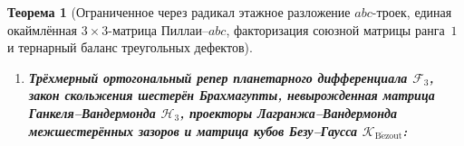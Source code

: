 \documentclass[11pt,a4paper]{article}
\theoremstyle{plain}
\newtheorem{theorem}{Теорема}[section]
\theoremstyle{definition}
\begin{document}
\begin{theorem}[Ограниченное через радикал этажное разложение $abc$-троек, единая окаймлённая $3\times 3$-матрица Пиллаи--$abc$, факторизация союзной матрицы ранга~$1$ и тернарный баланс треугольных дефектов]
\begin{enumerate}[label=\textbf{(\roman*)},leftmargin=*]
  \[
    \mathcal{P}_3(A,B,C) \;=\; \begin{pmatrix}
      A^2(B+C) & (B+2C)^3 & (2B+C)^3 \\
      (A+2C)^3 & B^2(A+C) & (2A+C)^3 \\
      (A-2B)^3 & (2A-B)^3 & C^2(A-B)
    \end{pmatrix},\qquad
    \mathcal{P}_3(A,B,C)\begin{pmatrix} A \\ B \\ -C \end{pmatrix} \;\equiv\; \begin{pmatrix} 0 \\ 0 \\ 0 \end{pmatrix},
  \]
  с определителем $\det\mathcal{P}_3(A,B,C) \equiv 0$ и следом $\operatorname{Tr}\mathcal{P}_3(A,B,C) \equiv A C(A+C)$ ($\operatorname{Tr}\mathcal{P}_3(3,125,128) = 3\cdot 128\cdot 131 = 50\,304$), а общее основание $7 = |{\triangle}(3)|-1$ связывает сумму коэффициентов полинома Паде $\widehat{P}_3(1,1) = 81 = 3^4$ и полный модуль кольца фаз $|\mathbb{Z}_{512}| = 512 = 2^9$ двойным тождеством Ферма--Каталана $2^5 + 7^2 = 3^4 = 81$ и $13^2 + 7^3 = 2^9 = 512$.
\item \textbf{Трёхмерный ортогональный репер планетарного дифференциала $\mathcal{F}_3$, закон скольжения шестерён Брахмагупты, невырожденная матрица Ганкеля--Вандермонда $\mathcal{H}_3$, проекторы Лагранжа--Вандермонда межшестерённых зазоров и матрица кубов Безу--Гаусса $\mathcal{K}_{\mathrm{B\acute{e}zout}}$:}

\end{enumerate}
\end{theorem}
\end{document}

